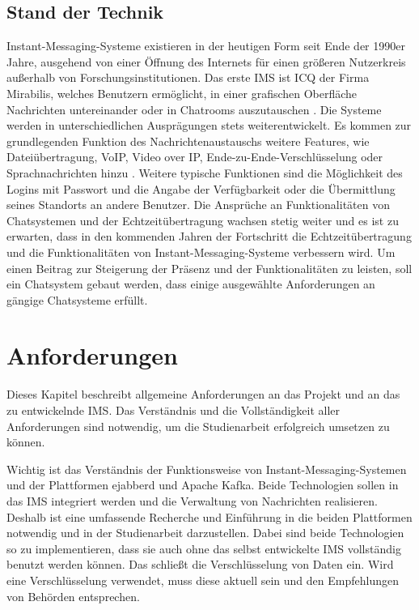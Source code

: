 \documentclass[a4paper,titlepage,halfparskip,12pt]{scrreprt}
\begin{document}
\begin{onehalfspacing}
\pagebreak

\section{Stand der Technik}
\label{sec:StandDerTechnik}

Instant-Messaging-Systeme existieren in der heutigen Form seit Ende der 1990er Jahre, ausgehend von einer Öffnung des Internets für einen größeren Nutzerkreis außerhalb von Forschungsinstitutionen. Das erste \ac{IMS} ist \ac{ICQ} der Firma Mirabilis, welches Benutzern ermöglicht, in einer grafischen Oberfläche Nachrichten untereinander oder in Chatrooms auszutauschen \cite{ICQ}. Die Systeme werden in unterschiedlichen Ausprägungen stets weiterentwickelt. Es kommen zur grundlegenden Funktion des Nachrichtenaustauschs weitere Features, wie Dateiübertragung, \ac{VoIP}, Video over IP, Ende-zu-Ende-Verschlüsselung oder Sprachnachrichten hinzu \cite{gross2007}. 
Weitere typische Funktionen sind die Möglichkeit des Logins mit Passwort und die Angabe der Verfügbarkeit oder die Übermittlung seines Standorts an andere Benutzer. Die Ansprüche an Funktionalitäten von Chatsystemen und der Echtzeitübertragung wachsen stetig weiter und es ist zu erwarten, dass in den kommenden Jahren der Fortschritt die Echtzeitübertragung und die Funktionalitäten von Instant-Messaging-Systeme verbessern wird. Um einen Beitrag zur Steigerung der Präsenz und der Funktionalitäten zu leisten, soll ein Chatsystem gebaut werden, dass einige ausgewählte Anforderungen an gängige Chatsysteme erfüllt.\cite{anastasiaIMS}

\pagebreak

\chapter{Anforderungen}
\label{Anforderungen}

Dieses Kapitel beschreibt allgemeine Anforderungen an das Projekt und an das zu entwickelnde \acs{IMS}. Das Verständnis und die Vollständigkeit aller Anforderungen sind notwendig, um die Studienarbeit erfolgreich umsetzen zu können.

Wichtig ist das Verständnis der Funktionsweise von Instant-Messaging-Systemen und der Plattformen ejabberd und Apache Kafka. Beide Technologien sollen in das \acs{IMS} integriert werden und die Verwaltung von Nachrichten realisieren. Deshalb ist eine umfassende Recherche und Einführung in die beiden Plattformen notwendig und in der Studienarbeit darzustellen. Dabei sind beide Technologien so zu implementieren, dass sie auch ohne das selbst entwickelte \acs{IMS} vollständig benutzt werden können. Das schließt die Verschlüsselung von Daten ein. Wird eine Verschlüsselung verwendet, muss diese aktuell sein und den Empfehlungen von Behörden entsprechen.


\end{onehalfspacing}
\end{document}
